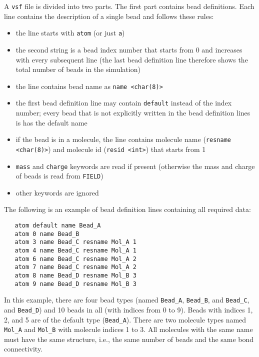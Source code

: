 A \texttt{vsf} file is divided into two parts. The first part contains bead
definitions. Each line contains the description of a single bead and
follows these rules:

\begin{itemize}[topsep=0pt,itemsep=0pt]
  \item the line starts with \texttt{atom} (or just \texttt{a})
  \item the second string is a bead index number that starts from 0 and
    increases with every subsequent line (the last bead definition line
    therefore shows the total number of beads in the simulation)
  \item the line contains bead name as \texttt{name <char(8)>}
  \item the first bead definition line may contain \texttt{default} instead
    of the index number; every bead that is not explicitly written in the
    bead definition lines is has the default name
  \item if the bead is in a molecule, the line contains molecule name
    (\texttt{resname <char(8)>}) and molecule id (\texttt{resid <int>})
    that starts from 1
  \item \texttt{mass} and \texttt{charge} keywords are read if present
    (otherwise the mass and charge of beads is read from \texttt{FIELD})
  \item other keywords are ignored
\end{itemize}

The following is an example of bead definition lines containing all
required data:

\begin{verbatim}
   atom default name Bead_A
   atom 0 name Bead_B
   atom 3 name Bead_C resname Mol_A 1
   atom 4 name Bead_C resname Mol_A 1
   atom 6 name Bead_C resname Mol_A 2
   atom 7 name Bead_C resname Mol_A 2
   atom 8 name Bead_D resname Mol_B 3
   atom 9 name Bead_D resname Mol_B 3
\end{verbatim}

In this example, there are four bead types (named \texttt{Bead\_A},
\texttt{Bead\_B}, and \texttt{Bead\_C}, and \texttt{Bead\_D}) and 10 beads
in all (with indices from 0 to 9). Beads with indices 1, 2, and 5 are of
the default type (\texttt{Bead\_A}). There are two molecule types named
\texttt{Mol\_A} and \texttt{Mol\_B} with molecule indices 1 to 3. All
molecules with the same name must have the same structure, i.e., the same
number of beads and the same bond connectivity.

